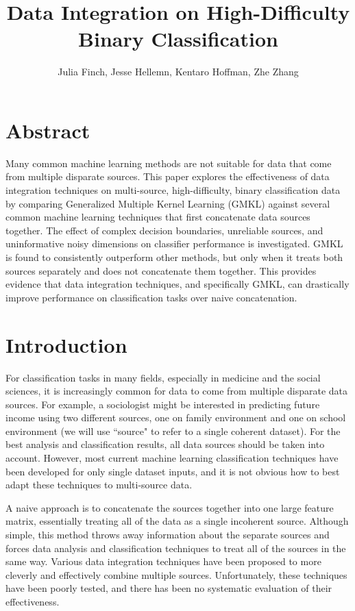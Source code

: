 \documentclass{article}
\begin{document}
\title{Data Integration on High-Difficulty Binary Classification}
\author{Julia Finch, Jesse Hellemn, Kentaro Hoffman, Zhe Zhang}
\maketitle


\section*{Abstract}

Many common machine learning methods are not suitable for data that come from
multiple disparate sources. This paper explores the effectiveness of data
integration techniques on multi-source, high-difficulty, binary classification
data by comparing Generalized Multiple Kernel Learning (GMKL) against several
common machine learning techniques that first concatenate data sources
together. The effect of complex decision boundaries, unreliable sources, and
uninformative noisy dimensions on classifier performance is investigated. GMKL
is found to consistently outperform other methods, but only when it treats both
sources separately and does not concatenate them together. This provides
evidence that data integration techniques, and specifically GMKL, can
drastically improve performance on classification tasks over naive
concatenation.



\section*{Introduction}

For classification tasks in many fields, especially in medicine and the social
sciences, it is increasingly common for data to come from multiple disparate
data sources. For example, a sociologist might be interested in predicting
future income using two different sources, one on family environment and one on
school environment (we will use ``source" to refer to a single coherent
dataset). For the best analysis and classification results, all data sources
should be taken into account. However, most current machine learning
classification techniques have been developed for only single dataset inputs,
and it is not obvious how to best adapt these techniques to multi-source data.

A naive approach is to concatenate the sources together into one large feature
matrix, essentially treating all of the data as a single incoherent source.
Although simple, this method throws away information about the separate sources
and forces data analysis and classification techniques to treat all of the
sources in the same way. Various data integration techniques have been proposed
to more cleverly and effectively combine multiple sources. Unfortunately, these
techniques have been poorly tested, and there has been no systematic evaluation
of their effectiveness.
\end{document}
